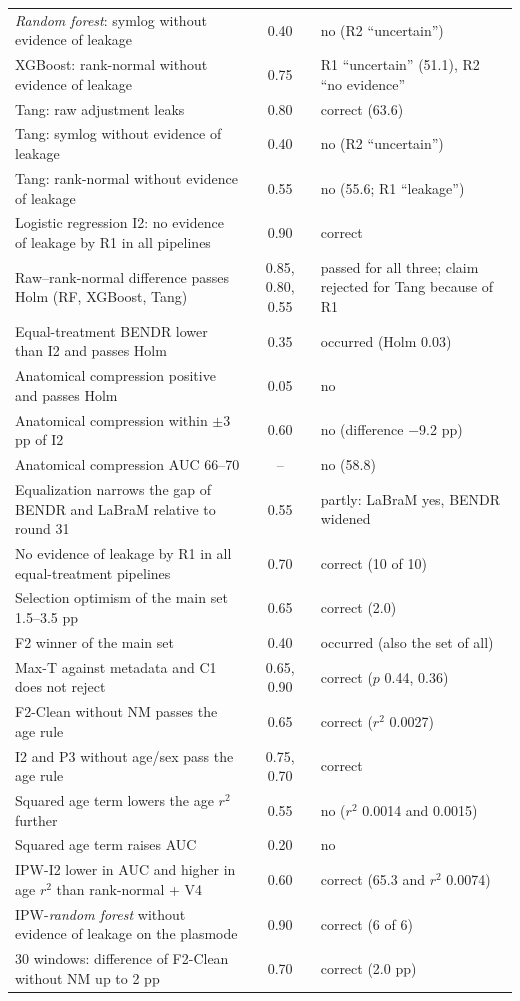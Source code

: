 {\begin{longtable}{p{}cp{}}
\textit{Random forest}: symlog without evidence of leakage & 0.40 & no (R2 ``uncertain'') \\
XGBoost: rank-normal without evidence of leakage & 0.75 & R1 ``uncertain'' (51.1), R2 ``no evidence'' \\
Tang: raw adjustment leaks & 0.80 & correct (63.6) \\
Tang: symlog without evidence of leakage & 0.40 & no (R2 ``uncertain'') \\
Tang: rank-normal without evidence of leakage & 0.55 & no (55.6; R1 ``leakage'') \\
Logistic regression I2: no evidence of leakage by R1 in all pipelines & 0.90 & correct \\
Raw--rank-normal difference passes Holm (RF, XGBoost, Tang) & 0.85, 0.80, 0.55 & passed for all three; claim rejected for Tang because of R1 \\
\midrule
Equal-treatment BENDR lower than I2 and passes Holm & 0.35 & occurred (Holm 0.03) \\
Anatomical compression positive and passes Holm & 0.05 & no \\
Anatomical compression within $\pm3$ pp of I2 & 0.60 & no (difference $-$9.2 pp) \\
Anatomical compression AUC 66--70 & -- & no (58.8) \\
Equalization narrows the gap of BENDR and LaBraM relative to round 31 & 0.55 & partly: LaBraM yes, BENDR widened \\
No evidence of leakage by R1 in all equal-treatment pipelines & 0.70 & correct (10 of 10) \\
Selection optimism of the main set 1.5--3.5 pp & 0.65 & correct (2.0) \\
F2 winner of the main set & 0.40 & occurred (also the set of all) \\
Max-T against metadata and C1 does not reject & 0.65, 0.90 & correct ($p$ 0.44, 0.36) \\
\midrule
F2-Clean without NM passes the age rule & 0.65 & correct ($r^2$ 0.0027) \\
I2 and P3 without age/sex pass the age rule & 0.75, 0.70 & correct \\
Squared age term lowers the age $r^2$ further & 0.55 & no ($r^2$ 0.0014 and 0.0015) \\
Squared age term raises AUC & 0.20 & no \\
IPW-I2 lower in AUC and higher in age $r^2$ than rank-normal + V4 & 0.60 & correct (65.3 and $r^2$ 0.0074) \\
IPW-\textit{random forest} without evidence of leakage on the plasmode & 0.90 & correct (6 of 6) \\
30 windows: difference of F2-Clean without NM up to 2 pp & 0.70 & correct (2.0 pp) \\
\end{longtable}
}

